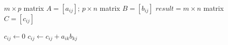   \REQUIRE $m \times p$ matrix $A = [a_{ij}]$; $p \times n$ matrix $B = [b_{ij}]$
  \ENSURE $result = m \times n$ matrix $C = [c_{ij}]$

		 	  \STATE $c_{ij} \leftarrow 0$
                   \STATE $c_{ij} \leftarrow c_{ij} + a_{ik}b_{kj}$
  		 	  \ENDFOR
  		 \ENDFOR
  \ENDFOR
